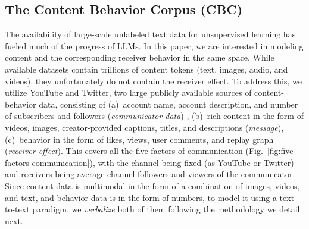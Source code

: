 \subsection{The Content Behavior Corpus (CBC)}
\label{sec:content behavior corpus}
The availability of large-scale unlabeled text data for unsupervised learning has fueled much of the progress of LLMs. In this paper, we are interested in modeling content and the corresponding receiver behavior in the same space. While available datasets contain trillions of content tokens (text, images, audio, and videos), they unfortunately do not contain the receiver effect. To address this, we utilize YouTube and Twitter, two large publicly available sources of content-behavior data, consisting of (a)~account name, account description, and number of subscribers and followers (\textit{communicator data}) , (b)~rich content in the form of videos, images, creator-provided captions, titles, and descriptions (\textit{message}), (c)~behavior in the form of likes, views, user comments, and replay graph (\textit{receiver effect}). This covers all the five factors of communication (Fig.~\ref{fig:five-factors-communication}), with the channel being fixed (as YouTube or Twitter) and receivers being average channel followers and viewers of the communicator. Since content data is multimodal in the form of a combination of images, videos, and text, and behavior data is in the form of numbers, to model it using a text-to-text paradigm, we \textit{verbalize} both of them following the methodology we detail next.



